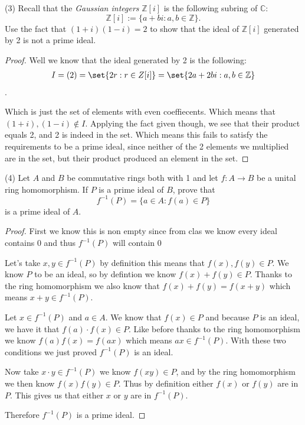 \documentclass[12pt]{article}
\DeclarePairedDelimiter\set\{\}
\newcommand      {\Z}         {{\mathbb Z}}
\newcommand      {\C}         {{\mathbb C}}
\begin{document}
(3) Recall that the \textit{Gaussian integers} $\Z[i]$ is the following subring of $\C$:
\begin{equation*}
	\Z[i]:=\{a+bi:a,b\in\Z\}.
\end{equation*}
Use the fact that $(1+i)(1-i)=2$ to show that the ideal of $\Z[i]$ generated by 2 is not a prime ideal.
\begin{proof}
	Well we know that the ideal generated by 2 is the following:
	\begin{align}
		I = (2) = \set{2r : r\in Z[i]} = \set{2a+2bi: a,b\in \Z}
	\end{align}.

	Which is just the set of elements with even coeffiecents. Which means that $(1+i),(1-i)\notin I$. Applying the fact given though, we see that their product equals 2, and 2 is indeed in the set. Which means this fails to satisfy the requirements to be a prime ideal, since neither of the 2 elements we multiplied are in the set, but their product produced an element in the set. 
\end{proof}
\newpage
(4) Let $A$ and $B$ be commutative rings both with 1 and let $f:A\to B$ be a unital ring homomorphism. If $P$ is a prime ideal of $B$, prove that
\begin{equation*}
	f^{-1}(P)=\{a\in A:f(a)\in P\}
\end{equation*}
is a prime ideal of $A$.
\begin{proof}
	First we know this is non empty since from clas we know every ideal contains $0$ and thus $f^{-1}(P)$ will contain 0 

	Let's take $x,y\in f^{-1}(P)$ by definition this means that $f(x),f(y)\in P$. We know $P$ to be an ideal, so by defintion we know $f(x)+f(y)\in P$. Thanks to the ring homomorphism we also know that $f(x)+ f(y) = f(x+y)$ which means $x+y \in f^{-1}(P)$.

	Let $x\in f^{-1}(P)$ and $a \in A$. We know that $f(x)\in P$ and because $P$ is an ideal, we have it that $f(a)\cdot f(x)\in P$. Like before thanks to the ring homomorphism we know $f(a)f(x) = f(ax)$ which means $ax \in f^{-1}(P)$. With these two conditions we just proved $f^{-1}(P)$ is an ideal. 

	Now take $x\cdot y\in f^{-1}(P)$ we know $f(xy)\in P$, and by the ring homomorphism we then know $f(x)f(y) \in P$. Thus by definition either $f(x)$ or $f(y)$ are in $P$. This gives us that either $x$ or $y$ are in $f^{-1}(P).$

	Therefore $f^{-1}(P)$ is a prime ideal. 
\end{proof}
\end{document}

